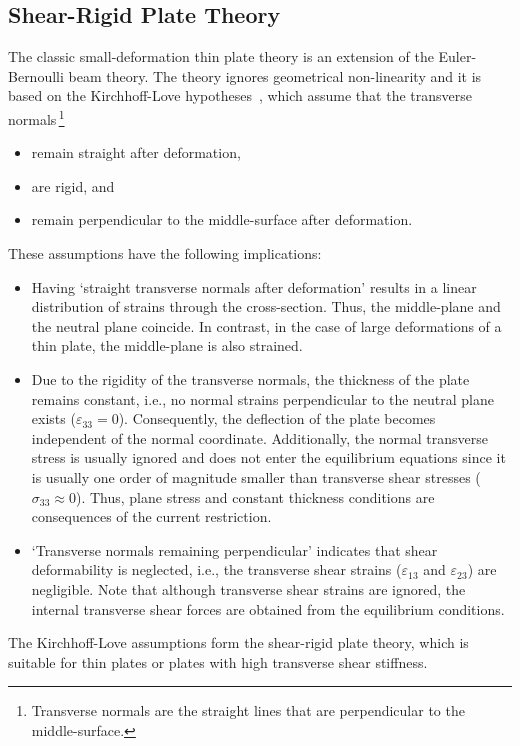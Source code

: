 \subsection{Shear-Rigid Plate Theory}
The classic small-deformation thin plate theory is an extension of the Euler-Bernoulli beam theory. The theory ignores geometrical non-linearity and it is based on the Kirchhoff-Love hypotheses~\autocite{Reddy.2006}, which assume that the transverse normals\,\footnote{Transverse normals are the straight lines that are perpendicular to the middle-surface.} 
\begin{itemize}
\item remain straight after deformation,
\item are rigid, and
\item remain perpendicular to the middle-surface after deformation.
\end{itemize}
These assumptions have the following implications:
\begin{itemize}
\item Having `straight transverse normals after deformation' results in a linear distribution of strains through the cross-section. Thus, the middle-plane and the neutral plane coincide. In contrast, in the case of large deformations of a thin plate, the middle-plane is also strained. 
\item Due to the rigidity of the transverse normals, the thickness of the plate remains constant, i.e., no normal strains perpendicular to the neutral plane exists ($\varepsilon_{33}=0$). Consequently, the deflection of the plate becomes independent of the normal coordinate. Additionally, the normal transverse stress is usually ignored and does not enter the equilibrium equations since it is usually one order of magnitude smaller than transverse shear stresses ($\sigma_{33}\approx 0$). Thus, plane stress and constant thickness conditions are consequences of the current restriction.
\item `Transverse normals remaining perpendicular' indicates that shear deformability is neglected, i.e., the transverse shear strains ($\varepsilon_{13}$ and $\varepsilon_{23}$) are negligible. Note that although transverse shear strains are ignored, the internal transverse shear forces are obtained from the equilibrium conditions.
\end{itemize}
The Kirchhoff-Love assumptions form the shear-rigid plate theory, which is suitable for thin plates or plates with high transverse shear stiffness. 

